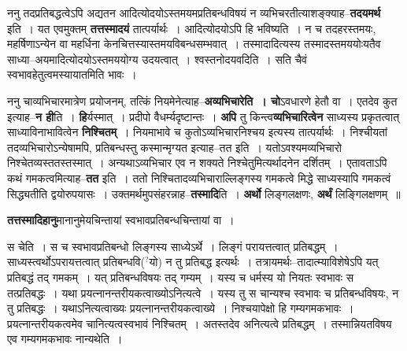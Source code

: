 \documentclass[article,12pt,a4paper]{memoir}
\newcommand{\unclear}[1]{($^{?}$#1)}
\begin{document}
	  \pstart ननु तदप्रतिबद्धत्वेऽपि अद्यतन आदित्योदयोऽस्तमयमप्रतिबन्धविषयं न व्यभिचरतीत्याशङ्क्याह--\textbf{तदयमर्थ} इति । यत एवमुक्तम् \textbf{तत्तस्मादयं} तात्पर्यार्थः । आदित्योदयोऽपि हि भविष्यति । न च तदहरस्तमयः, महर्षिणाऽन्येन वा महर्धिना केनचित्तस्यास्तमयविबन्धसम्भवात् । तस्मादादित्यस्य तस्मादस्तमययोःयतैव साध्या--अयमादित्योदयोऽस्तमययोग्य उदयत्वात् । श्वस्तनोदयवदिति । सति चैवं स्वभावहेतुत्वमस्यायातमिति भावः ।
	\pend
      

	  \pstart ननु चाव्यभिचारमात्रेण प्रयोजनम्, तत्किं नियमेनेत्याह--\textbf{अव्यभिचारेति । चो}ऽवधारणे हेतौ वा । एतदेव कुत इत्याह--\textbf{न ही}ति । \leavevmode{} \textbf{हि}र्यस्मात् । प्रदीपो वैधर्म्यदृष्टान्तः । \textbf{अपि} तु किन्त्व\textbf{व्यभिचारित्वेन} साध्यस्य प्रकृतत्वात् साध्याविनाभावित्वेन \textbf{निश्चितम्} । नियमाभावे च कुतोऽव्यभिचारनिश्चय इत्यस्य तात्पर्यार्थः । निश्चीयतां तदव्यभिचारोऽन्येषामपि, प्रतिबन्धस्तु कस्मान्मृग्यत इत्याह--तत इति । यतोऽवश्यमव्यभिचारो निश्चेतव्यस्ततस्तस्मात् । अन्यथाऽव्यभिचार एव न शक्यते निश्चेतुमित्यर्थादनेन दर्शितम् । एतावताऽपि कथं गमकत्वमित्याह--\textbf{तत} इति । ततो निश्चितादव्यभिचाराल्लिङ्गस्य गमकत्वे मिद्धे साध्यस्यापि गमकत्वं सिद्ध्यतीति द्वयोरुपयासः । उक्तमर्थमुपसंहरन्नाह--\textbf{तस्मादि}ति । \textbf{अर्थो} लिङ्गलक्षणः, \textbf{अर्थं} लिङ्गिलक्षणम् ॥
	\pend
      

	  \pstart \textbf{तत्तस्मादिहानु}मानानुमेयचिन्तायां स्वभावप्रतिबन्धचिन्तायां वा ।
	\pend
	  \bigskip
	  \begingroup
	

	  \pstart स चेति । स च स्वभावप्रतिबन्धो लिङ्गस्य साध्येऽर्थे । लिङ्गं परायत्तत्वात् प्रतिबद्धम् । साध्यस्त्वर्थोऽपरायत्तत्वात् प्रतिबन्धवि\unclear{यो} न तु प्रतिबद्ध इत्यर्थः । तत्रायमर्थः--तादात्म्याविशेषेऽपि यत् प्रतिबद्धं तद् गमकम् । यत् प्रतिबन्धविषयः तद् गम्यम् । यस्य च धर्मस्य यो नियतः स्वभावः स तत्प्रतिबद्धः । यथा प्रयत्नानन्तरीयकत्वाख्योऽनित्यत्वे । यस्य तु स चान्यश्च स्वभावः च प्रतिबन्धविषयः, न तु प्रतिबद्धः । यथाऽनित्यत्वाख्यः प्रयत्नानन्तरीयकत्वाख्ये । निश्चयापेक्षो हि गम्यगमकभावः । प्रयत्नान्तरीयकत्वमेव चानित्यत्वस्वभावं निश्चितम् । अतस्तदेव अनित्यत्वे प्रतिबद्धम् । तस्मान्नियतविषय एव गम्यगमकभावः नान्यथेति ।
	\pend
      
\end{document}
